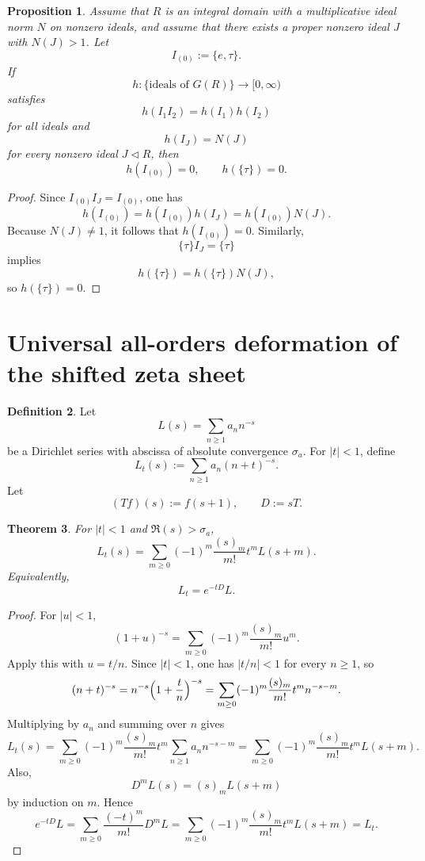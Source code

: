 \documentclass[11pt]{amsart}
\numberwithin{equation}{section}
\newtheorem{theorem}{Theorem}[section]
\newtheorem{proposition}[theorem]{Proposition}
\theoremstyle{definition}
\newtheorem{definition}[theorem]{Definition}
\begin{document}
\begin{proposition}\label{prop:scalar-norm-collapse}
Assume that $R$ is an integral domain with a multiplicative ideal norm $N$ on nonzero ideals, and assume that there exists a proper nonzero ideal $J$ with $N(J)>1$. Let
\[
I_{(0)}:=\{e,\tau\}.
\]
If
\[
h:\{\text{ideals of }G(R)\}\to [0,\infty)
\]
satisfies
\[
h(I_1I_2)=h(I_1)h(I_2)
\]
for all ideals and
\[
h(I_J)=N(J)
\]
for every nonzero ideal $J\triangleleft R$, then
\[
h(I_{(0)})=0,
\qquad
h(\{\tau\})=0.
\]
\end{proposition}

\begin{proof}
Since $I_{(0)}I_J=I_{(0)}$, one has
\[
h(I_{(0)})=h(I_{(0)})h(I_J)=h(I_{(0)})N(J).
\]
Because $N(J)\neq1$, it follows that $h(I_{(0)})=0$. Similarly,
\[
\{\tau\}I_J=\{\tau\}
\]
implies
\[
h(\{\tau\})=h(\{\tau\})N(J),
\]
so $h(\{\tau\})=0$. 
\end{proof}

\section{Universal all-orders deformation of the shifted zeta sheet}

\begin{definition}\label{def:Lt}
Let
\[
L(s)=\sum_{n\ge1}a_n n^{-s}
\]
be a Dirichlet series with abscissa of absolute convergence $\sigma_a$. For $|t|<1$, define
\[
L_t(s):=\sum_{n\ge1}a_n(n+t)^{-s}.
\]
Let
\[
(Tf)(s):=f(s+1),
\qquad
D:=sT.
\]
\end{definition}

\begin{theorem}\label{thm:universal-taylor-deformation}
For $|t|<1$ and $\Re(s)>\sigma_a$,
\[
\boxed{
L_t(s)=\sum_{m\ge0}(-1)^m\frac{(s)_m}{m!}t^mL(s+m).
}
\]
Equivalently,
\[
\boxed{
L_t=e^{-tD}L.
}
\]
\end{theorem}

\begin{proof}
For $|u|<1$,
\[
(1+u)^{-s}=\sum_{m\ge0}(-1)^m\frac{(s)_m}{m!}u^m.
\]
Apply this with $u=t/n$. Since $|t|<1$, one has $|t/n|<1$ for every $n\ge1$, so
\[
(n+t)^{-s}
=
n^{-s}\Bigl(1+\frac{t}{n}\Bigr)^{-s}
=
\sum_{m\ge0}(-1)^m\frac{(s)_m}{m!}t^m n^{-s-m}.
\]
Multiplying by $a_n$ and summing over $n$ gives
\[
L_t(s)
=
\sum_{m\ge0}(-1)^m\frac{(s)_m}{m!}t^m\sum_{n\ge1}a_n n^{-s-m}
=
\sum_{m\ge0}(-1)^m\frac{(s)_m}{m!}t^mL(s+m).
\]
Also,
\[
D^mL(s)=(s)_mL(s+m)
\]
by induction on $m$. Hence
\[
e^{-tD}L=
\sum_{m\ge0}\frac{(-t)^m}{m!}D^mL
=
\sum_{m\ge0}(-1)^m\frac{(s)_m}{m!}t^mL(s+m)=L_t.
\]

\end{proof}
\end{document}
